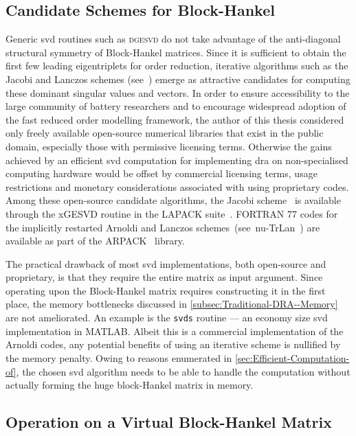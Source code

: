 \subsection{Candidate Schemes for Block-Hankel }

Generic  \gls{svd}  routines  such  as \textsc{dgesvd}  do  not  take  advantage
of  the  anti-diagonal  structural  symmetry  of  Block-Hankel  matrices.  Since
it  is sufficient  to  obtain  the first  few  leading  eigentriplets for  order
reduction,  iterative  algorithms  such  as   the  Jacobi  and  Lanczos  schemes
(see~\cite{Golub2013})  emerge  as  attractive candidates  for  computing  these
dominant singular  values and vectors. In  order to ensure accessibility  to the
large community of  battery researchers and to encourage  widespread adoption of
the fast reduced order modelling framework, the author of this thesis considered
only freely available  open-source numerical libraries that exist  in the public
domain, especially  those with permissive  licensing terms. Otherwise  the gains
achieved by  an efficient  \gls{svd} computation  for implementing  \gls{dra} on
non-specialised  computing  hardware would  be  offset  by commercial  licensing
terms,  usage restrictions  and  monetary considerations  associated with  using
proprietary  codes. Among  these  open-source candidate  algorithms, the  Jacobi
scheme~\cite{Golub2013} is  available through the  xGESVD routine in  the LAPACK
suite~\cite{Anderson1999}. FORTRAN 77 codes for the implicitly restarted Arnoldi
and Lanczos schemes~(see~nu-TrLan~\cite{Yamazaki2008}) are  available as part of
the ARPACK~\cite{Lehoucq1998} library.

The practical drawback  of most \gls{svd} implementations,  both open-source and
proprietary, is  that they require  the entire  matrix as input  argument. Since
operating upon  the Block-Hankel  matrix requires constructing  it in  the first
place, the memory bottlenecks discussed in \cref{subsec:Traditional-DRA--Memory}
are not  ameliorated. An  example is  the \texttt{svds}  routine ---  an economy
size  \gls{svd}  implementation  in  MATLAB\@.   Albeit  this  is  a  commercial
implementation  of  the  Arnoldi  codes,  any potential  benefits  of  using  an
iterative scheme is nullified by the memory penalty. Owing to reasons enumerated
in \cref{sec:Efficient-Computation-of}, the chosen  \gls{svd} algorithm needs to
be able to handle the computation without actually forming the huge block-Hankel
matrix in memory.

\subsection{ Operation on a Virtual Block-Hankel Matrix}

